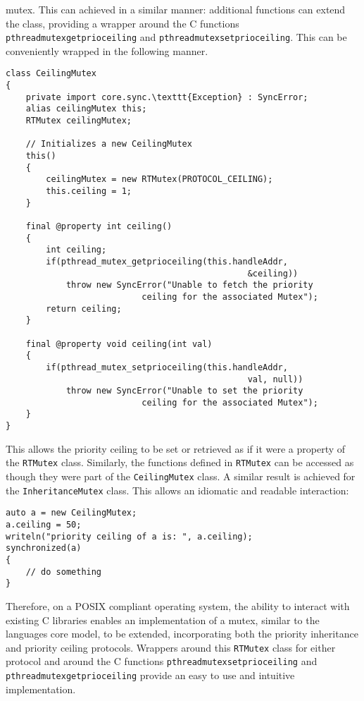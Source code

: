 mutex. This can achieved in a similar manner: additional 
functions can extend the class, providing a wrapper around the C functions 
\texttt{pthread\textunderscore{}mutex\textunderscore{}getprioceiling} and 
\texttt{pthread\textunderscore{}mutex\textunderscore{}setprioceiling}.
This can be conveniently wrapped in the following manner. 
\begin{lstlisting}[basicstyle=\small]
class CeilingMutex 
{
    private import core.sync.\texttt{Exception} : SyncError;
    alias ceilingMutex this;
    RTMutex ceilingMutex;

    // Initializes a new CeilingMutex
    this()
    {
        ceilingMutex = new RTMutex(PROTOCOL_CEILING);
        this.ceiling = 1;
    }

    final @property int ceiling()
    {
        int ceiling; 
        if(pthread_mutex_getprioceiling(this.handleAddr, 
                                                &ceiling))
            throw new SyncError("Unable to fetch the priority 
                           ceiling for the associated Mutex"); 
        return ceiling; 
    }

    final @property void ceiling(int val)
    {
        if(pthread_mutex_setprioceiling(this.handleAddr, 
                                                val, null))
            throw new SyncError("Unable to set the priority 
                           ceiling for the associated Mutex"); 
    }
}
\end{lstlisting}
This allows the priority ceiling to be set or retrieved as if it were a property of 
the \texttt{RTMutex} class. Similarly, the functions defined in \texttt{RTMutex} 
can be accessed as though they were part of the \texttt{CeilingMutex} class. 
A similar result is achieved for the \texttt{InheritanceMutex} class.
This allows an idiomatic and readable interaction: 
\begin{lstlisting}[basicstyle=\small]
auto a = new CeilingMutex;
a.ceiling = 50; 
writeln("priority ceiling of a is: ", a.ceiling); 
synchronized(a) 
{
    // do something
}
\end{lstlisting}
Therefore, on a POSIX compliant operating system, the ability to interact with 
existing C libraries enables an implementation of a mutex, similar to the languages 
core model, to be extended, incorporating both the priority inheritance and 
priority ceiling protocols. Wrappers around this \texttt{RTMutex} class for 
either protocol and around the C functions 
\texttt{pthread\textunderscore{}mutex\textunderscore{}setprioceiling} 
and \texttt{pthread\textunderscore{}mutex\textunderscore{}getprioceiling{}} 
provide an easy to use and intuitive implementation. 

